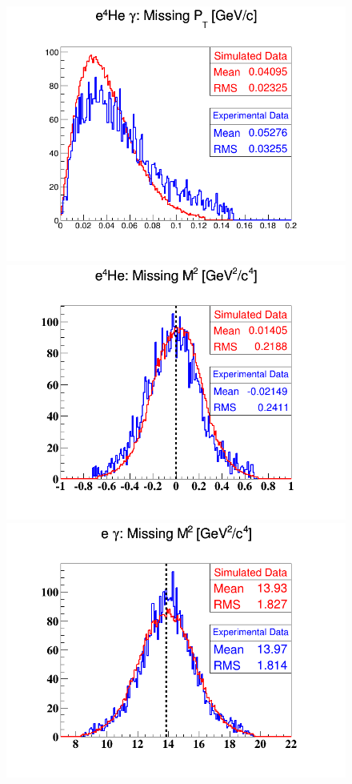\begin{figure}[h!]
\includegraphics[scale=0.36]{fig_dvcs/comp/Coh_e4Hegamma_PT_Mis.png}
\includegraphics[scale=0.36]{fig_dvcs/comp/Coh_e4He_M2_Mis.png}
\includegraphics[scale=0.36]{fig_dvcs/comp/Coh_egamma_M2_Mis.png}

\end{figure}
